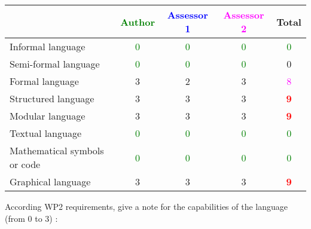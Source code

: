 \begin{tabular}{|l | c | c | c | c|}
  \hline
  & \textcolor{green}{Author} & \textcolor{blue}{Assessor 1} & \textcolor{magenta}{Assessor 2} & Total \\
  \hline 
  Informal language & \textcolor{green}{0}   & \textcolor{green}{0}   & \textcolor{green}{0} & \textcolor{green}{0}  \\
  \hline 
  Semi-formal language & \textcolor{green}{0}   & \textcolor{green}{0}   & \textcolor{green}{0} &  0 \\
  \hline
  Formal language &3 &2 & 3   & \textcolor{magenta}{8} \\
  \hline
  Structured language &3 &3 & 3   & \textcolor{red}{\textbf{9}} \\
  \hline
  Modular language &3 &3 & 3   & \textcolor{red}{\textbf{9}} \\
  \hline
  Textual language & \textcolor{green}{0}   & \textcolor{green}{0}   & \textcolor{green}{0} & \textcolor{green}{0} \\
  \hline
  Mathematical symbols or code & \textcolor{green}{0}   & \textcolor{green}{0}   & \textcolor{green}{0} & \textcolor{green}{0} \\
  \hline
  Graphical language &3 &3 & 3   & \textcolor{red}{\textbf{9}} \\
  \hline
\end{tabular}

According WP2 requirements, give a note for the capabilities of the language (from 0 to 3) :

